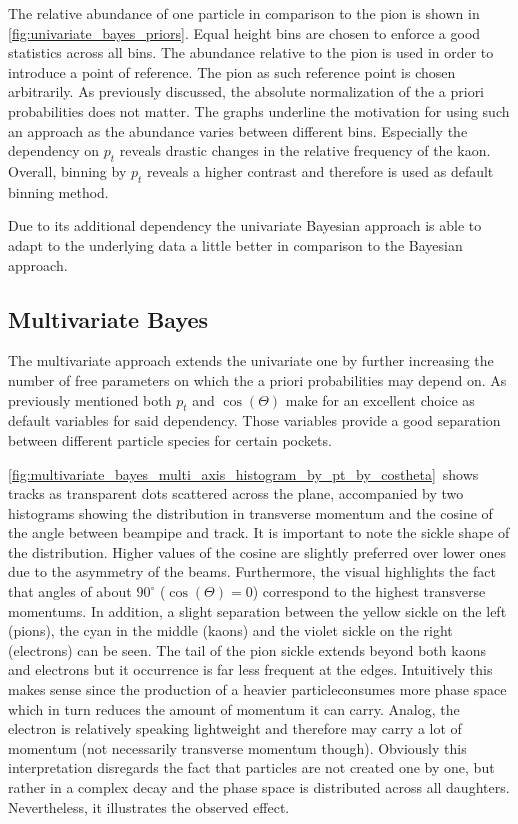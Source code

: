 The relative abundance of one particle in comparison to the pion is shown in \autoref{fig:univariate_bayes_priors}. Equal height bins are chosen to enforce a good statistics across all bins. The abundance relative to the pion is used in order to introduce a point of reference. The pion as such reference point is chosen arbitrarily. As previously discussed, the absolute normalization of the a priori probabilities does not matter. The graphs underline the motivation for using such an approach as the abundance varies between different bins. Especially the dependency on $p_t$ reveals drastic changes in the relative frequency of the kaon. Overall, binning by $p_t$ reveals a higher contrast and therefore is used as default binning method.

Due to its additional dependency the univariate Bayesian approach is able to adapt to the underlying data a little better in comparison to the Bayesian approach.

\subsection{Multivariate Bayes}
\label{subsec:bayesian_approach_multivariate_bayes}

The multivariate approach extends the univariate one by further increasing the number of free parameters on which the a priori probabilities may depend on. As previously mentioned both $p_t$ and $\cos(\Theta)$ make for an excellent choice as default variables for said dependency. Those variables provide a good separation between different particle species for certain pockets.

\autoref{fig:multivariate_bayes_multi_axis_histogram_by_pt_by_costheta}~shows tracks as transparent dots scattered across the plane, accompanied by two histograms showing the distribution in transverse momentum and the cosine of the angle between beampipe and track. It is important to note the sickle shape of the distribution. Higher values of the cosine are slightly preferred over lower ones due to the asymmetry of the beams. Furthermore, the visual highlights the fact that angles of about $90^{\circ}$ ($\cos(\Theta) = 0$) correspond to the highest transverse momentums. In addition, a slight separation between the yellow sickle on the left (pions), the cyan  in the middle (kaons) and the violet sickle on the right (electrons) can be seen. The tail of the pion sickle extends beyond both kaons and electrons but it occurrence is far less frequent at the edges. Intuitively this makes sense since the production of a heavier particle\footnotemark consumes more phase space which in turn reduces the amount of momentum it can carry. Analog, the electron is relatively speaking lightweight and therefore may carry a lot of momentum (not necessarily transverse momentum though). Obviously this interpretation disregards the fact that particles are not created one by one, but rather in a complex decay and the phase space is distributed across all daughters. Nevertheless, it illustrates the observed effect.

